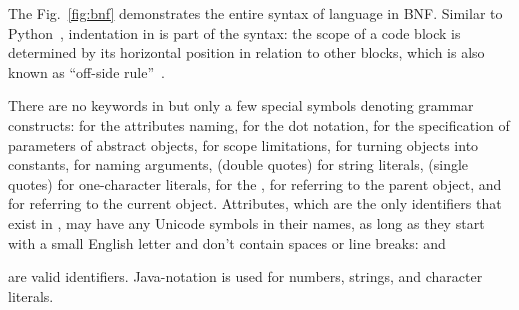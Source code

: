 \newcommand\sntx[1]{{\sffamily #1}}

The Fig.~\ref{fig:bnf} demonstrates the entire syntax of \eo{} language in BNF.
Similar to Python~\citep{lutz2013learning}, indentation in \eo{} is part of the syntax:
the scope of a code block is determined by its horizontal position
in relation to other blocks, which is also known as ``off-side rule''~\citep{landin1966next}.

There are no keywords in \eo{} but only a few special symbols
denoting grammar constructs:
  \ff{>} for the attributes naming,
   for the dot notation,
  \ff{[]} for the specification of parameters of abstract objects,
  \ff{()} for scope limitations,
  \ff{!} for turning objects into constants,
  \ff{:} for naming arguments,
   (double quotes) for string literals,
   (single quotes) for one-character literals,
   for the ,
  \ff{\^{}} for referring to the parent object,
  and
  \ff{\$} for referring to the current object.
Attributes, which are the only identifiers that exist in \eo{}, may have
any Unicode symbols in their names, as long as they start with a small English letter
and don't contain spaces or line breaks:
 and
\begin{CJK}{UTF8}{gbsn}
\end{CJK}
 are valid identifiers.
Java-notation is used for numbers, strings, and character literals.

